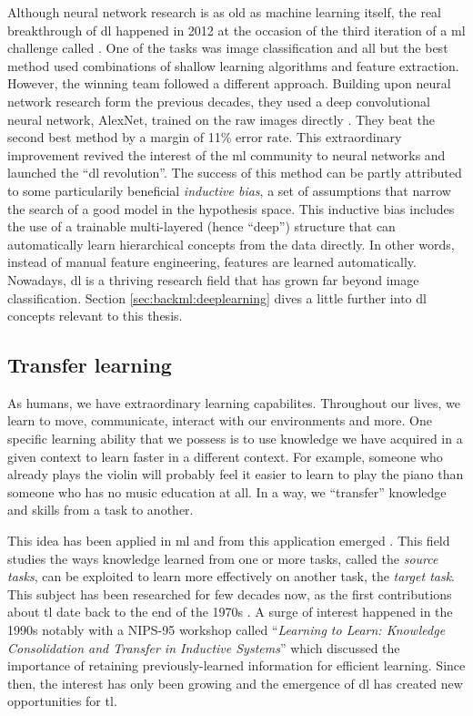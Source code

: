 Although neural network research is as old as machine learning itself, the real
breakthrough of \acrlong{dl} happened in 2012 at the occasion of the third iteration
of a \acrlong{ml} challenge called  \parencite{russakovsky2015imagenet}.
One of the tasks was image classification and all but the best method used
combinations of shallow learning algorithms and feature extraction. However, the
winning team followed a different approach. Building upon neural network research
form the previous decades, they used a deep convolutional neural network, AlexNet,
trained on the raw images directly \parencite{krizhevsky2012imagenet}. They beat
the second best method by a margin of 11\% error rate. This extraordinary improvement
revived the interest of the \acrlong{ml} community to neural networks and launched
the ``\acrlong{dl} revolution''. The success of this method can be partly attributed
to some particularily beneficial \textit{inductive bias}, a set of assumptions
that narrow the search of a good model in the hypothesis space. This inductive
bias includes the use of a trainable multi-layered (hence ``deep'') structure that
can automatically learn hierarchical concepts from the data directly. In other
words, instead of manual feature engineering, features are learned automatically.
Nowadays, \acrlong{dl} is a thriving research field that has grown far beyond
image classification. Section \ref{sec:backml:deeplearning} dives a little further
into \acrlong{dl} concepts relevant to this thesis.

\subsection{Transfer learning}
\label{ssec:backml:transfer}

As humans, we have extraordinary learning capabilites. Throughout our lives, we
learn to move, communicate, interact with our environments and more. One specific
learning ability that we possess is to use knowledge we have acquired in a given
context to learn faster in a different context. For example, someone who already
plays the violin will probably feel it easier to learn to play the piano than
someone who has no music education at all. In a way, we ``transfer'' knowledge
and skills from a task to another.

This idea has been applied in \acrlong{ml} and from this application emerged
 \parencite{yang2020transfer}. This field studies the ways knowledge
learned from one or more tasks, called the \textit{source tasks}, can be exploited
to learn more effectively on another task, the \textit{target task}. This subject
has been researched for few decades now, as the first contributions about \acrlong{tl}
date back to the end of the 1970s \parencite{bozinovski2020reminder}. A surge of
interest happened in the 1990s notably with a NIPS-95 workshop called
``\textit{Learning to Learn: Knowledge Consolidation and Transfer in Inductive Systems}''
which discussed the importance of retaining previously-learned information for
efficient learning. Since then, the interest has only been growing and the emergence
of \acrlong{dl} has created new opportunities for \acrlong{tl}.

